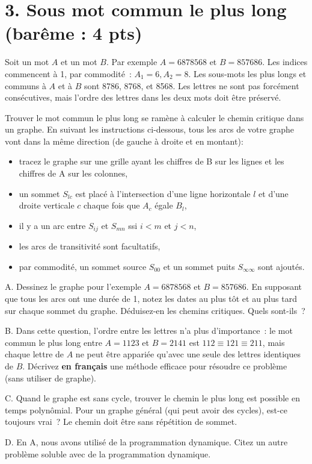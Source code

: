 \documentclass[11pt]{article}
\begin{document}
{
\section*{3. Sous mot commun le plus long (barême : 4 pts)}
Soit un mot $A$ et un mot $B$. 
Par exemple $A=6878568$ et $B=857686$. 
Les indices commencent à 1, par commodité~: $A_1=6, A_2=8$.
Les sous-mots les plus longs et communs à $A$ et à $B$ sont
8786, 8768, et 8568. Les lettres ne sont pas forcément consécutives, mais l'ordre des lettres dans les deux mots doit être préservé.

\medskip
Trouver le mot commun le plus long se ramène à calculer le chemin critique dans un graphe. En suivant les instructions ci-dessous, tous les arcs de votre graphe vont dans la même direction (de gauche à droite et en montant):

\begin{itemize}
\item tracez le graphe sur une grille ayant les chiffres de B sur les lignes et les chiffres de A sur les colonnes,
\item un sommet $S_{lc}$ est placé à l'intersection d'une ligne horizontale $l$ et d'une droite verticale $c$ chaque fois que  $A_c$ égale $B_l$,
\item   il y a un arc entre $S_{ij}$ et $S_{mn}$ ssi $i<m$ et $j<n$,
\item les arcs de transitivité sont facultatifs, 
\item par commodité, un sommet source $S_{00}$ et un sommet puits $S_{\infty\infty}$ sont ajoutés.
\end{itemize}

\medskip
A. Dessinez le graphe pour l'exemple $A=6878568$ et $B=857686$.
En supposant que tous les arcs ont une durée de 1, notez les dates au plus tôt
et au plus tard sur chaque sommet du graphe. Déduisez-en les chemins critiques.
Quels sont-ils~? 

\medskip
B. Dans cette question, l'ordre  entre les lettres n'a plus d'importance~:
le mot commun le plus long entre $A=1123$ et $B=2141$ est $112\equiv 121\equiv 211$, mais chaque lettre de $A$ ne peut être appariée 
qu'avec une seule des lettres identiques de  $B$. 
Décrivez {\bf en français} une méthode efficace pour résoudre ce problème (sans utiliser de graphe).

\medskip
C. Quand le graphe est sans cycle, trouver le chemin le plus long est possible en temps polynômial. Pour un graphe général (qui peut avoir des cycles), est-ce toujours vrai~? Le chemin doit être sans répétition de sommet.

\medskip
D. En A, nous avons utilisé de la programmation dynamique. Citez un autre problème soluble avec de la programmation dynamique.
}
\end{document}
